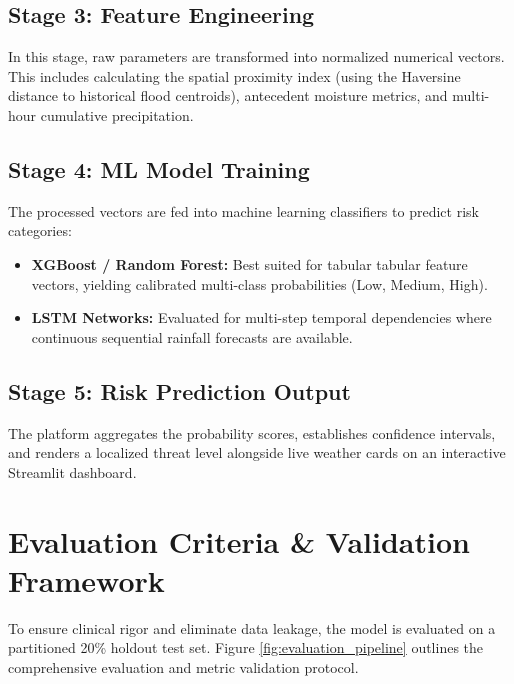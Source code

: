 \documentclass[11pt,a4paper]{article}
\begin{document}
\subsection{Stage 3: Feature Engineering}
In this stage, raw parameters are transformed into normalized numerical vectors. This includes calculating the spatial proximity index (using the Haversine distance to historical flood centroids), antecedent moisture metrics, and multi-hour cumulative precipitation.

\subsection{Stage 4: ML Model Training}
The processed vectors are fed into machine learning classifiers to predict risk categories:
\begin{itemize}[noitemsep]
    \item \textbf{XGBoost / Random Forest:} Best suited for tabular tabular feature vectors, yielding calibrated multi-class probabilities (Low, Medium, High).
    \item \textbf{LSTM Networks:} Evaluated for multi-step temporal dependencies where continuous sequential rainfall forecasts are available.
\end{itemize}

\subsection{Stage 5: Risk Prediction Output}
The platform aggregates the probability scores, establishes confidence intervals, and renders a localized threat level alongside live weather cards on an interactive Streamlit dashboard.

\section{Evaluation Criteria \& Validation Framework}
To ensure clinical rigor and eliminate data leakage, the model is evaluated on a partitioned 20\% holdout test set. Figure \ref{fig:evaluation_pipeline} outlines the comprehensive evaluation and metric validation protocol.
\end{document}
